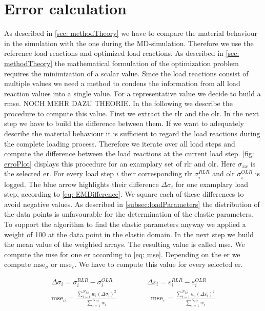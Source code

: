     \section{Error calculation}\label{sec: errorCalculation}
    As described in \autoref{sec: methodTheory} we have to compare the material behaviour in the  simulation with the one during the MD-simulation. Therefore we use the reference load reactions and optimized load reactions. As described in \autoref{sec: methodTheory} the mathematical formulation of the optimization problem requires the minimization of a scalar value. Since the load reactions consist of multiple values we need a method to condens the information from all load reaction values into a single value.  For a representative value we decide to build a \acrlong{rmse}. NOCH MEHR DAZU THEORIE. In the following we describe the procedure to compute this value.
    First we extract the \acrshort{rlr} and the \acrshort{olr}. In the next step we have to build the difference between them.  If we want to adequately describe the material behaviour it is sufficient to regard the load reactions during the complete loading process. Therefore we iterate over all load steps and compute the difference between the load reactions at the current load step. \autoref{fig: erroPlot} displays this procedure for an examplary set of \acrshort{rlr} and \acrshort{olr}. Here $\sigma_{xx}$ is the selected \acrlong{er}. For every load step $i$ their corresponding \acrshort{rlr} $\sigma_{i}^{\scriptscriptstyle RLR}$ and \acrshort{olr} $\sigma_{i}^{\scriptscriptstyle OLR}$ is logged. The blue arrow highlights their difference $\Delta\sigma_{i}$ for one examplary load step, according to \autoref{eq: EMDifference}. We square each of these differences to avoid negative values.  As described in \autoref{subsec:loadParameters} the distribution of the data points is unfavourable for the determination of the elastic parameters. To support the algorithm to find the elastic parameters anyway we applied a weight of 100 at the data point in the elastic domain. In the next step we build the mean value of the weighted arrays. The resulting value is called \acrfull{mse}. We compute the \acrshort{mse} for one \acrlong{er} according to \autoref{eq: mse}. Depending on the \acrlong{er} we compute $\text{mse}_{\sigma}$ or $\text{mse}_{\varepsilon}$. We have to compute this value for every selected \acrlong{er}. 

    \begin{gather}
        \label{eq: EMDifference}
        \Delta\sigma_{i} = \sigma_{i}^{\scriptscriptstyle RLR} - \sigma_{i}^{\scriptscriptstyle OLR} \hspace{2cm}
        \Delta\varepsilon_{i} = \varepsilon_{i}^{\scriptscriptstyle RLR} - \varepsilon_{i}^{\scriptscriptstyle OLR}\\
        \label{eq: mse}
        \text{mse}_{\sigma} = \frac{\displaystyle\sum_{i=1}^{N_{LS}} w_i (\Delta\sigma_{i})^2}{\displaystyle\sum_{i=1}^{N_{LS}}w_i } \hspace{2cm}
        \text{mse}_{\varepsilon} = \frac{\displaystyle\sum_{i=1}^{N_{LS}} w_i (\Delta\varepsilon_{i})^2}{\displaystyle\sum_{i=1}^{N_{LS}}w_i }
    \end{gather}
    
